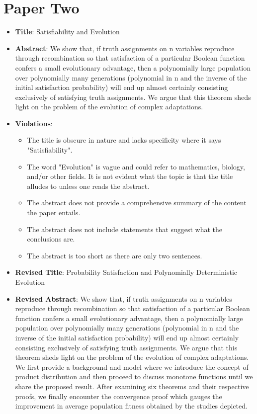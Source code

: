 \documentclass[11pt,twocolumn]{article}
\begin{document}
\section{Paper Two}
\begin{itemize}
  \item{\bf{Title}}: Satisfiability and Evolution 
  \item{\bf{Abstract}}: 
We show that, if truth assignments on n variables reproduce through recombination so that satisfaction of a particular Boolean function confers a small evolutionary advantage, then a polynomially large population over polynomially many generations (polynomial in n and the inverse of the initial satisfaction probability) will end up almost certainly consisting exclusively of satisfying truth assignments. We argue that this theorem sheds light on the problem of the evolution of complex adaptations.

  \item{\bf{Violations}}:
  \begin{itemize}
  \item The title is obscure in nature and lacks specificity where it says "Satisfiability".  
  \item The word "Evolution" is vague and could refer to mathematics, biology, and/or other fields. It is not evident what the topic is that the title alludes to unless one reads the abstract. 
  \item The abstract does not provide a comprehensive summary of the content the paper entails. 
  \item The abstract does not include statements that suggest what the conclusions are.
  \item The abstract is too short as there are only two sentences. 
  \end{itemize}
  
  \item{\bf{Revised Title}}: Probability Satisfaction and Polynomially Deterministic Evolution
  
  \item{\bf{Revised Abstract}}: We show that, if truth assignments on n variables reproduce through recombination so that satisfaction of a particular Boolean function confers a small evolutionary advantage, then a polynomially large population over polynomially many generations (polynomial in n and the inverse of the initial satisfaction probability) will end up almost certainly consisting exclusively of satisfying truth assignments. We argue that this theorem sheds light on the problem of the evolution of complex adaptations. We first provide a background and model where we introduce the concept of product distribution and then proceed to discuss monotone functions until we share the proposed result. After examining six theorems and their respective proofs, we finally encounter the convergence proof which gauges the improvement in average population fitness obtained by the studies depicted. \cite{evolution} 
  
\end{itemize}



\end{document}
